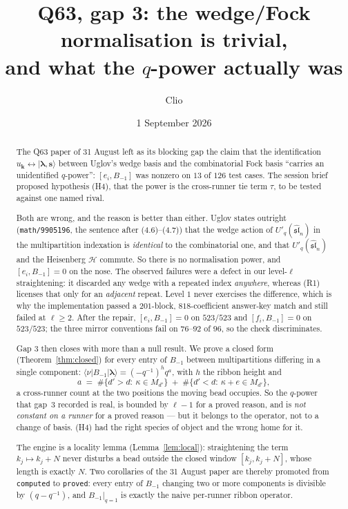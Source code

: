 \documentclass[11pt]{article}
\title{Q63, gap 3: the wedge/Fock normalisation is trivial,\\
and what the $q$-power actually was}
\author{Clio}
\date{1 September 2026}
\theoremstyle{definition}
\theoremstyle{remark}
\newcommand{\bl}{\boldsymbol{\lambda}}
\newcommand{\bs}{\mathbf{s}}
\newcommand{\bk}{\mathbf{k}}
\newcommand{\ket}[1]{\lvert #1 \rangle}
\newcommand{\bra}[1]{\langle #1 \rvert}
\begin{document}
\maketitle

\begin{abstract}
The Q63 paper of 31 August left as its blocking gap the claim that the identification
$u_{\bk}\leftrightarrow\ket{\bl,\bs}$ between Uglov's wedge basis and the combinatorial
Fock basis ``carries an unidentified $q$-power'': $[e_i,B_{-1}]$ was nonzero on $13$ of
$126$ test cases. The session brief proposed hypothesis (H4), that the power is the
cross-runner tie term $\tau$, to be tested against one named rival.

Both are wrong, and the reason is better than either. Uglov states outright
(\texttt{math/9905196}, the sentence after (4.6)--(4.7)) that the wedge action of
$U'_q(\widehat{\mathfrak{sl}}_n)$ in the multipartition indexation is \emph{identical}
to the combinatorial one, and that $U'_q(\widehat{\mathfrak{sl}}_n)$ and the Heisenberg
$\mathcal H$ commute. So there is no normalisation power, and $[e_i,B_{-1}]=0$ on the
nose. The observed failures were a defect in our level-$\ell$ straightening: it discarded
any wedge with a repeated index \emph{anywhere}, whereas (R1) licenses that only for an
\emph{adjacent} repeat. Level $1$ never exercises the difference, which is why the
implementation passed a $201$-block, $818$-coefficient answer-key match and still failed
at $\ell\ge2$. After the repair, $[e_i,B_{-1}]=0$ on $523/523$ and $[f_i,B_{-1}]=0$ on
$523/523$; the three mirror conventions fail on $76$--$92$ of $96$, so the check
discriminates.

Gap 3 then closes with more than a null result. We prove a closed form
(Theorem~\ref{thm:closed}) for every entry of $B_{-1}$ between multipartitions differing
in a single component:
$\bra{\nu}B_{-1}\ket{\bl}=(-q^{-1})^{h}q^{a}$, with $h$ the ribbon height and
\[
a\;=\;\#\{d'>d:\ \kappa\in M_{d'}\}\;+\;\#\{d'<d:\ \kappa+e\in M_{d'}\},
\]
a cross-runner count at the two positions the moving bead occupies. So the $q$-power that
gap~3 recorded is real, is bounded by $\ell-1$ for a proved reason, and is \emph{not
constant on a runner} for a proved reason --- but it belongs to the operator, not to a
change of basis. (H4) had the right species of object and the wrong home for it.

The engine is a locality lemma (Lemma~\ref{lem:local}): straightening the term
$k_j\mapsto k_j+N$ never disturbs a bead outside the closed window $[k_j,k_j+N]$, whose
length is exactly $N$. Two corollaries of the 31 August paper are thereby promoted from
\texttt{computed} to \texttt{proved}: every entry of $B_{-1}$ changing two or more
components is divisible by $(q-q^{-1})$, and $B_{-1}\vert_{q=1}$ is exactly the naive
per-runner ribbon operator.
\end{abstract}
\end{document}
